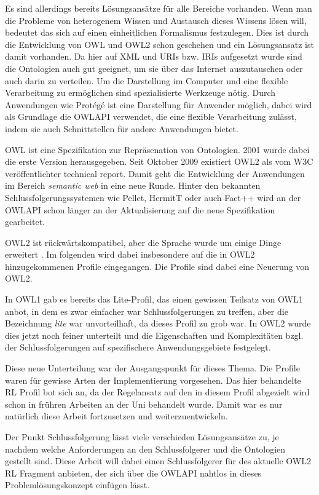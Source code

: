 Es sind allerdings bereits Lösungsansätze für alle Bereiche vorhanden. Wenn man die Probleme von heterogenem Wissen und Austausch dieses Wissens lösen will, bedeutet das sich auf einen einheitlichen Formalismus festzulegen. Dies ist durch die Entwicklung von OWL und OWL2 schon geschehen und ein Lösungsansatz ist damit vorhanden. Da hier auf XML und URIs bzw. IRIs aufgesetzt wurde sind die Ontologien auch gut geeignet, um sie über das Internet auszutauschen oder auch darin zu verteilen. Um die Darstellung im Computer und eine flexible Verarbeitung zu ermöglichen sind spezialisierte Werkzeuge nötig. Durch Anwendungen wie Protégé ist eine Darstellung für Anwender möglich, dabei wird als Grundlage die OWLAPI verwendet, die eine flexible Verarbeitung zulässt, indem sie auch Schnittstellen für andere Anwendungen bietet.

OWL ist eine Spezifikation zur Repräsenation von Ontologien. 2001 wurde dabei die erste Version herausgegeben. Seit Oktober 2009 existiert OWL2 als vom W3C veröffentlichter technical report. Damit geht die Entwicklung der Anwendungen im Bereich \emph{semantic web} in eine neue Runde. Hinter den bekannten Schlussfolgerungssystemen wie Pellet, HermitT oder auch Fact++ wird an der OWLAPI schon länger an der Aktualisierung auf die neue Spezifikation gearbeitet.

OWL2 ist rückwärtskompatibel, aber die Sprache wurde um einige Dinge erweitert \cite{Golbreich2008}. Im folgenden wird dabei  insbesondere auf die in OWL2 hinzugekommenen Profile eingegangen. Die Profile sind dabei eine Neuerung von OWL2.

In OWL1 gab es bereits das Lite-Profil, das einen gewissen Teilsatz von OWL1 anbot, in dem es zwar einfacher war Schlussfolgerungen zu treffen, aber die Bezeichnung \emph{lite} war unvorteilhaft, da dieses Profil zu grob war. In OWL2 wurde dies jetzt noch feiner unterteilt und die Eigenschaften und Komplexitäten bzgl. der Schlussfolgerungen auf spezifischere Anwendungsgebiete festgelegt.

Diese neue Unterteilung war der Ausgangspunkt für dieses Thema. Die Profile waren für gewisse Arten der Implementierung vorgesehen. Das hier behandelte RL Profil bot sich an, da der Regelansatz auf den in diesem Profil abgezielt wird schon in frühren Arbeiten an der Uni behandelt wurde. Damit war es nur natürlich diese Arbeit fortzusetzen und weiterzuentwickeln.

Der Punkt Schlussfolgerung lässt viele verschieden Lösungsansätze zu, je nachdem welche Anforderungen an den Schlussfolgerer und die Ontologien gestellt sind. Diese Arbeit will dabei einen Schlussfolgerer für des aktuelle  OWL2 RL Fragment anbieten, der sich über die OWLAPI nahtlos in dieses Problemlösungskonzept einfügen lässt.

